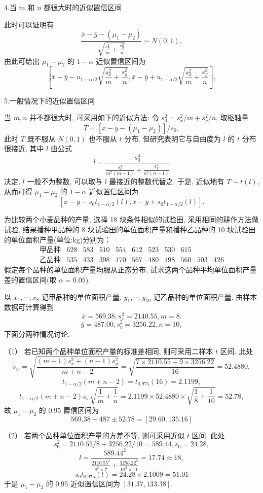 4.当 $m$ 和 $n$ 都很大时的近似置信区间

此时可以证明有
\[\frac{\bar x-\bar y-(\mu_1-\mu_2)}{\sqrt{\frac{s_x^2}{m}+\frac{s_y^2}{n}}}\sim N(0,1),\]
由此可给出 $\mu_1-\mu_2$ 的 $1-\alpha$ 近似置信区间为
\[\left[\bar x-\bar y-u_{1-\alpha/2}\sqrt{\frac{s_x^2}{m}+\frac{s_y^2}{n}},\bar x-\bar y+u_{1-\alpha/2}\sqrt{\frac{s_x^2}{m}+\frac{s_y^2}{n}}\right],\]

5.一般情况下的近似置信区间

当 $m,n$ 并不都很大时, 可采用如下的近似方法: 令 $s_0^2=s_x^2/m+s_y^2/n$, 取枢轴量
\[T=[\bar x-\bar y-(\mu_1-\mu_2)]/s_0,\]
此时 $T$ 既不服从 $N(0,1)$ 也不服从 $t$ 分布. 但研究表明它与自由度为 $l$ 的 $t$ 分布很接近, 其中 $l$ 由公式
\[l=\frac{s_0^4}{\frac{s_x^4}{m^2(m-1)}+\frac{s_y^4}{n^2(n-1)}}\]
决定, $l$ 一般不为整数, 可以取与 $l$ 最接近的整数代替之. 于是, 近似地有 $T\sim t(l)$, 从而可得 $\mu_1-\mu_2$ 的 $1-\alpha$ 近似置信区间为
\[[\bar x-\bar y-s_0t_{1-\alpha/2}(l),\bar x-\bar y+s_0t_{1-\alpha/2}(l)].\]

\begin{example}\label{exam:6.5.9}
为比较两个小麦品种的产量, 选择 18 块条件相似的试验田, 采用相同的耕作方法做试验, 结果播种甲品种的 8 块试验田的单位面积产量和播种乙品种的 10 块试验田的单位面积产量(单位:kg)分别为：
\[\begin{array}{ccccccccccc}
\text{甲品种} & 628 & 583 & 510 & 554 & 612 & 523 & 530 & 615 &     &\\
\text{乙品种} & 535 & 433 & 398 & 470 & 567 & 480 & 498 & 560 & 503 & 426
\end{array}\]
假定每个品种的单位面积产量均服从正态分布, 试求这两个品种平均单位面积产量差的置信区间(取 $\alpha=0.05$).
\end{example}\begin{solution}
以 $x_1,\cdots,x_8$ 记甲品种的单位面积产量, $y_1,\cdots,y_{10}$ 记乙品种的单位面积产量, 由样本数据可计算得到
\[\bar x=569.38,s_x^2=2140.55,m=8.\]
\[\bar y=487.00,s_y^2=3256.22,n=10,\]
下面分两种情况讨论.

  （1） 若已知两个品种单位面积产量的标准差相同, 则可采用二样本 $t$ 区间.
此处
\[s_w=\sqrt{\frac{(m-1)s_x^2+(n-1)s_y^2}{m+n-2}}=\sqrt{\frac{7\times2110.55+9\times3256.22}{16}}=52.4880,\]
\[t_{1-\alpha/2}(m+n-2)=t_{0.975}(16)=2.1199,\]
\[t_{1-\alpha/2}(m+n-2)s_w\sqrt{\frac{1}{m}+\frac{1}{n}}=2.1199\times52.4880\times\sqrt{\frac{1}{8}+\frac{1}{10}}=52.78,\]
故 $\mu_1-\mu_2$ 的 0.95 置信区间为
\[569.38-487\pm52.78=[29.60,135.16]\]

  （2） 若两个品种单位面积产量的方差不等, 则可采用近似 $t$ 区间. 此处
\[s_0^2=2110.55/8+3256.22/10=589.44,s_0=24.28,\]
\[l=\frac{589.44^2}{\frac{2110.55^2}{8^2\times7}+\frac{3256.22^2}{10^2\times11}}=17.74\approx18,\]
\[s_0t_{0.975}(l)=24.28\times2.1009=51.01\]
于是 $\mu_1-\mu_2$ 的 0.95 近似置信区间为 $[31.37, 133.38]$.
\end{solution}

